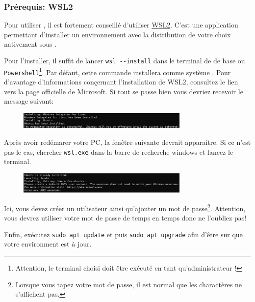     \subsubsection[Prérequis][fr.wikipedia.org/wiki/Windows_Subsystem_for_Linux]{Prérequis: WSL2}

    Pour utiliser \dockerdesktop, il est fortement conseillé d'utiliser \href{https://learn.microsoft.com/fr-fr/windows/wsl/install}{WSL2}. C'est une application \windows{} permettant d'installer un environnement \linux{} avec la distribution de votre choix nativement sous \windows{}. 

    Pour l'installer, il suffit de lancer \verb|wsl --install| dans le terminal de \windows{} de base ou \texttt{Powershell}\footnote{Attention, le terminal choisi doit être exécuté en tant qu'administrateur !}. Par défaut, cette commande installera \ubuntu{} comme système \linux. Pour d'avantage d'informations conçernant l'installation de WSL2, consultez le lien vers la page officielle de Microsoft. Si tout se passe bien vous devriez recevoir le message suivant:

    \begin{figure}[!th]
        \centering
        \includegraphics[width=0.75\textwidth]{Images_formation/ubuntu_installation.pdf}
    \end{figure}

    Après avoir redémarer votre PC, la fenêtre suivante devrait apparaitre. Si ce n'est pas le cas, chercher \texttt{wsl.exe} dans la barre de recherche windows et lancez le terminal.

    \begin{figure}[!th]
        \centering
        \includegraphics[width=0.75\textwidth]{Images_formation/user_creation.pdf}
    \end{figure}

    Ici, vous devez créer un utilisateur ainsi qu'ajouter un mot de passe\footnote{Lorsque vous tapez votre mot de passe, il est normal que les charactères ne s'affichent pas.}. Attention, vous devrez utiliser votre mot de passe de temps en temps donc ne l'oubliez pas!

    Enfin, exécutez \verb|sudo apt update| et puis \verb|sudo apt upgrade| afin d'être sur que votre environment est à jour.

